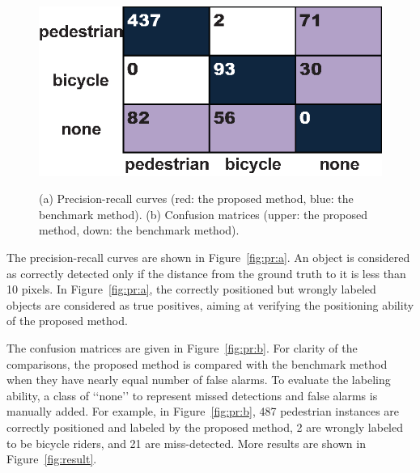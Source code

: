 \begin{figure}
{\begin{minipage}[b]{0.47\textwidth}
\includegraphics{cm1.eps}
\end{minipage}
\label{fig:pr:b}}
\caption[Comparisons with benchmark method]{(a) Precision-recall curves (red: the proposed method, blue: the benchmark method). (b) Confusion matrices (upper: the proposed method, down: the benchmark method).}
\label{fig:pr}
\end{figure}

The precision-recall curves are shown in Figure~\ref{fig:pr:a}. An object is considered as correctly detected only if the distance from the ground truth to it is less than 10 pixels. In Figure~\ref{fig:pr:a}, the correctly positioned but wrongly labeled objects are considered as true positives, aiming at verifying the positioning ability of the proposed method.

The confusion matrices are given in Figure~\ref{fig:pr:b}. For clarity of the comparisons, the proposed method is compared with the benchmark method when they have nearly equal number of false alarms. To evaluate the labeling ability, a class of {\lq\lq}none{\rq\rq} to represent missed detections and false alarms is manually added. For example, in Figure~\ref{fig:pr:b}, 487 pedestrian instances are correctly positioned and labeled by the proposed method, 2 are wrongly labeled to be bicycle riders, and 21 are miss-detected. More results are shown in Figure~\ref{fig:result}.

